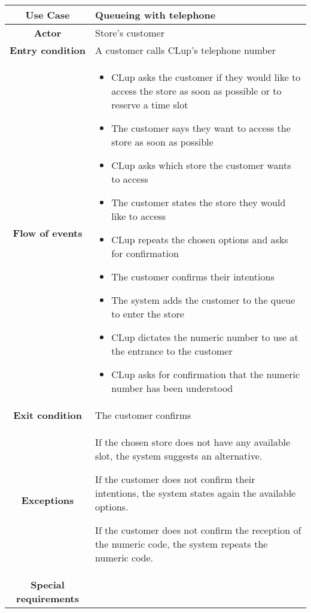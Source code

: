 \documentclass[../../main.tex]{subfiles}
\begin{document}
      \begin{table}[H]
        \centering
          \begin{tabular}{c m{}}
          \hline
          \textbf{Use Case} & Queueing with telephone\\ \hline
          \textbf{Actor} & Store's customer\\ \hline
          \textbf{Entry condition} & A customer calls CLup's telephone number\\  \hline
          \textbf{Flow of events} & \begin{itemize}
                                      \item CLup asks the customer if they would like to access the store as soon as possible or to reserve a time slot
                                      \item The customer says they want to access the store as soon as possible
                                      \item CLup asks which store the customer wants to access
                                      \item The customer states the store they would like to access
                                      \item CLup repeats the chosen options and asks for confirmation
                                      \item The customer confirms their intentions
                                      \item The system adds the customer to the queue to enter the store
                                      \item CLup dictates the numeric number to use at the entrance to the customer
                                      \item CLup asks for confirmation that the numeric number has been understood
                                    \end{itemize}\\ \hline
          \textbf{Exit condition} & The customer confirms \\ \hline
          \textbf{Exceptions} & If the chosen store does not have any available slot, the system suggests an alternative.
          
                                If the customer does not confirm their intentions, the system states again the available options.
                                
                                If the customer does not confirm the reception of the numeric code, the system repeats the numeric code.\\ \hline
          \textbf{Special requirements} &\\ \hline
          \end{tabular}
      \end{table}
\end{document}
